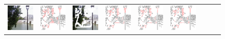 \documentclass[10pt,journal,compsoc]{IEEEtran}
\begin{document}
%
%
%

\begin{figure}[hbt]
	\small
	\setlength{\tabcolsep}{2.0pt}
	\centering
	\begin{tabular}{ccccccccc}
		\includegraphics[width=.104\textwidth]{Ablation/MECNet/GT1}  &
		\includegraphics[width=.104\textwidth]{Ablation/MECNet/edge_gt_1}&
		\includegraphics[width=.104\textwidth]{Ablation/MECNet/input1}  &
		\includegraphics[width=.104\textwidth]{Ablation/MECNet/edge_mecnets_1} &
		\includegraphics[width=.104\textwidth]{Ablation/MECNet/edge_mecnetml_1}  &
		\includegraphics[width=.104\textwidth]{Ablation/MECNet/edge_mecnet_1}&

\end{tabular}
\end{figure}
\end{document}
